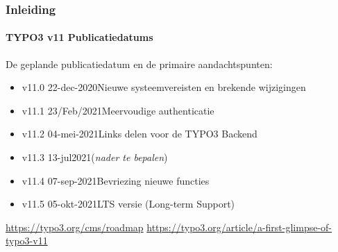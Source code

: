 %

\begin{frame}[fragile]
	\frametitle{Inleiding}
	\framesubtitle{TYPO3 v11 Publicatiedatums}

	De geplande publicatiedatum en de primaire aandachtspunten:

	\begin{itemize}
		\item
			\begingroup
				\color{typo3orange}
				v11.0 \tabto{1.1cm}22-dec-2020\tabto{3.4cm}Nieuwe systeemvereisten en brekende wijzigingen
			\endgroup
		\item v11.1 \tabto{1.1cm}23/Feb/2021\tabto{3.4cm}Meervoudige authenticatie
		\item v11.2 \tabto{1.1cm}04-mei-2021\tabto{3.4cm}Links delen voor de TYPO3 Backend
		\item v11.3 \tabto{1.1cm}13-jul2021\tabto{3.4cm}(\textit{nader te bepalen})
		\item v11.4 \tabto{1.1cm}07-sep-2021\tabto{3.4cm}Bevriezing nieuwe functies
		\item v11.5 \tabto{1.1cm}05-okt-2021\tabto{3.4cm}LTS versie (Long-term Support)

	\end{itemize}

	\smaller
		\url{https://typo3.org/cms/roadmap}\newline
		\url{https://typo3.org/article/a-first-glimpse-of-typo3-v11}
	\normalsize

\end{frame}

